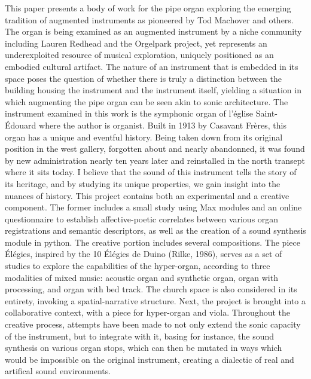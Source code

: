 \documentclass[12pt,twoside,maitrise]{dms}
\theoremstyle{definition}
\begin{document}
This paper presents a body of work for the pipe organ exploring the emerging tradition of augmented instruments as pioneered by Tod Machover and others. 
The organ is being examined as an augmented instrument by a niche community including Lauren Redhead and the Orgelpark project, yet represents an underexploited resource of musical exploration, uniquely positioned as an embodied cultural artifact. 
The nature of an instrument that is embedded in its space poses the question of whether there is truly a distinction between the building housing the instrument and the instrument itself, yielding a situation in which augmenting the pipe organ can be seen akin to sonic architecture. 
The instrument examined in this work is the symphonic organ of l'église Saint-Édouard where the author is organist. 
Built in 1913 by Casavant Frères, this organ has a unique and eventful history. 
Being taken down from its original position in the west gallery, forgotten about and nearly abandonned, it was found by new administration nearly ten years later and reinstalled in the north transept where it sits today. 
I believe that the sound of this instrument tells the story of its heritage, and by studying its unique properties, we gain insight into the nuances of history. 
This project contains both an experimental and a creative component. 
The former includes a small study using Max modules and an online questionnaire to establish affective-poetic correlates between various organ registrations and semantic descriptors, as well as the creation of a sound synthesis module in python. 
The creative portion includes several compositions. 
The piece Élégies, inspired by the 10 Élégies de Duino (Rilke, 1986), serves as a set of studies to explore the capabilities of the hyper-organ, according to three modalities of mixed music: acoustic organ and synthetic organ, organ with processing, and organ with bed track. 
The church space is also considered in its entirety, invoking a spatial-narrative structure. 
Next, the project is brought into a collaborative context, with a piece for hyper-organ and viola. 
Throughout the creative process, attempts have been made to not only extend the sonic capacity of the instrument, but to integrate with it, basing for instance, the sound synthesis on various organ stops, which can then be mutated in ways which would be impossible on the original instrument, creating a dialectic of real and artifical sound environments.

\end{document}
